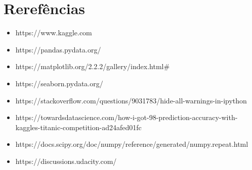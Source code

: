 \documentclass[11pt]{article}
\providecommand{\tightlist}{%
      \setlength{\itemsep}{0pt}\setlength{\parskip}{0pt}}
\begin{document}
    \section{Rerefências}\label{rerefuxeancias}

\begin{itemize}
\tightlist
\item
  https://www.kaggle.com
\item
  https://pandas.pydata.org/
\item
  https://matplotlib.org/2.2.2/gallery/index.html\#
\item
  https://seaborn.pydata.org/
\item
  https://stackoverflow.com/questions/9031783/hide-all-warnings-in-ipython
\item
  https://towardsdatascience.com/how-i-got-98-prediction-accuracy-with-kaggles-titanic-competition-ad24afed01fc
\item
  https://docs.scipy.org/doc/numpy/reference/generated/numpy.repeat.html
\item
  https://discussions.udacity.com/
\end{itemize}


    
    
    
    
\end{document}
